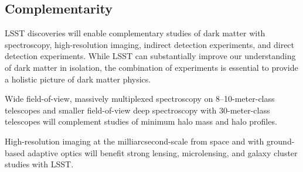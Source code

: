 \documentclass[12pt]{article}
\begin{document}
\vspace{-1em} \subsection*{Complementarity} \vspace{-0.5em}

LSST discoveries will enable complementary studies of dark matter with spectroscopy, high-resolution imaging, indirect detection experiments, and direct detection experiments.
While LSST can substantially improve our understanding of dark matter in isolation, the combination of experiments is essential to provide a holistic picture of dark matter physics.

Wide field-of-view, massively multiplexed spectroscopy on 8--10-meter-class telescopes and smaller field-of-view deep spectroscopy with 30-meter-class telescopes will complement studies of minimum halo mass and halo profiles.

 High-resolution imaging at the milliarcsecond-scale from space and with ground-based adaptive optics will benefit strong lensing, microlensing, and galaxy cluster studies with LSST.
\end{document}
